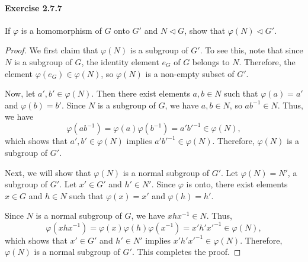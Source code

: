 \documentclass{article}
\begin{document}
\paragraph{Exercise 2.7.7} If $\varphi$ is a homomorphism of $G$ onto $G'$ and $N \triangleleft G$, show that $\varphi(N) \triangleleft G'$.
\begin{proof}
We first claim that $\varphi(N)$ is a subgroup of $G'$. To see this, note that since $N$ is a subgroup of $G$, the identity element $e_G$ of $G$ belongs to $N$. Therefore, the element $\varphi(e_G) \in \varphi(N)$, so $\varphi(N)$ is a non-empty subset of $G'$.

Now, let $a', b' \in \varphi(N)$. Then there exist elements $a, b \in N$ such that $\varphi(a) = a'$ and $\varphi(b) = b'$. Since $N$ is a subgroup of $G$, we have $a, b \in N$, so $ab^{-1} \in N$. Thus, we have
$$\varphi(ab^{-1}) = \varphi(a) \varphi(b^{-1}) = a'b'^{-1} \in \varphi(N),$$
which shows that $a', b' \in \varphi(N)$ implies $a'b'^{-1} \in \varphi(N)$. Therefore, $\varphi(N)$ is a subgroup of $G'$.

Next, we will show that $\varphi(N)$ is a normal subgroup of $G'$. Let $\varphi(N) = N'$, a subgroup of $G'$. Let $x' \in G'$ and $h' \in N'$. Since $\varphi$ is onto, there exist elements $x \in G$ and $h \in N$ such that $\varphi(x) = x'$ and $\varphi(h) = h'$.

Since $N$ is a normal subgroup of $G$, we have $xhx^{-1} \in N$. Thus,
$$\varphi(xhx^{-1}) = \varphi(x)\varphi(h)\varphi(x^{-1}) = x'h'x'^{-1} \in \varphi(N),$$
which shows that $x' \in G'$ and $h' \in N'$ implies $x'h'x'^{-1} \in \varphi(N)$. Therefore, $\varphi(N)$ is a normal subgroup of $G'$. This completes the proof.
\end{proof}
\end{document}
